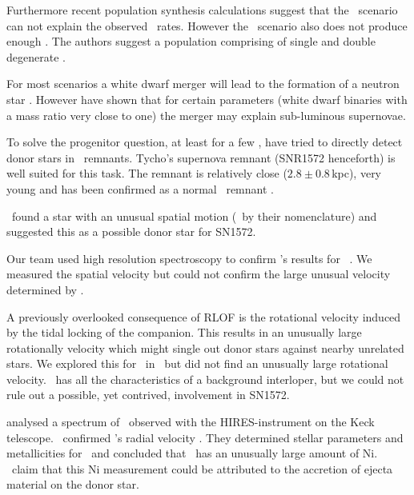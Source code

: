 Furthermore recent population synthesis calculations \citep{2009ApJ...699.2026R, 2010A&A...515A..89M,2010A&A...521A..85Y} suggest 
that the \sd\ scenario can not explain the observed \sneia\ rates. However the \dd\ scenario also does not produce enough \sneia. The authors suggest a population comprising of single and double degenerate \sneia. 


For most scenarios a white dwarf merger will lead to the formation of a neutron star \citep{1985A&A...150L..21S}. However \citet{2010Natur.463...61P} have shown that for certain parameters (white dwarf binaries with a mass ratio very close to one) the merger may explain sub-luminous supernovae. 

To solve the progenitor question, at least for a few \sneia, \citet[][henceforth \rl]{2004Natur.431.1069R} have tried to directly detect donor stars in \snia\ remnants. Tycho's supernova remnant (SNR1572 henceforth) is well suited for this task. The remnant is relatively close ($2.8\pm0.8$\,kpc), very young and has been confirmed as a normal \snia\ remnant \citep{2006ApJ...645.1373B, 2008Natur.456..617K}. 

\rl\ found a star with an unusual spatial motion (\starg\ by their nomenclature) and suggested this as a possible donor star for SN1572. 

Our team used high resolution spectroscopy to confirm \rl's results for \starg\ \citep[][henceforth \wek]{2009ApJ...701.1665K}. We measured the spatial velocity but could not confirm the large unusual velocity determined by \rl. 

A previously overlooked consequence of RLOF is the rotational velocity induced by the tidal locking of the companion. This results in an unusually large rotationally velocity which might single out donor stars against nearby unrelated stars. We explored this for \starg\ in \wek\ but did not find an unusually large rotational velocity. \starg\ has all the characteristics of a background interloper, but we could not rule out a possible, yet contrived, involvement in SN1572.

\citet[henceforth \gh]{2009ApJ...691....1H} analysed a spectrum of \starg\ observed with the HIRES-instrument on the Keck telescope. \gh\ confirmed \wek's radial velocity . They determined stellar parameters and metallicities for \starg\ and concluded that \starg\ has an unusually large amount of Ni. \gh\ claim that this Ni measurement could be attributed to the accretion of ejecta material on the donor star. 

